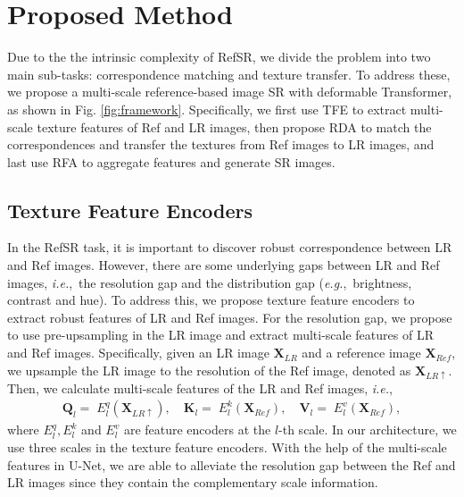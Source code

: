 \documentclass[runningheads]{llncs}
\def\ie{\mbox{\textit{i.e.}, }}
\def\eg{\mbox{\textit{e.g.}, }}
\def\bK{{\bm{K}}}
\def\bQ{{\bm{Q}}}
\def\bV{{\bm{V}}}
\def\bX{{\bm{X}}}
\begin{document}
\section{Proposed Method} 
Due to the the intrinsic complexity of RefSR, we divide the problem into two main sub-tasks: correspondence matching and texture transfer.
To address these, we propose a multi-scale reference-based image SR with deformable Transformer, as shown in Fig. \ref{fig:framework}.
Specifically, we first use TFE to extract multi-scale texture features of Ref and LR images, then propose RDA to match the correspondences and transfer the textures from Ref images to LR images, and last use RFA to aggregate features and generate SR images. 

\subsection{Texture Feature Encoders}
In the RefSR task, it is important to discover robust correspondence between LR and Ref images.
However, there are some underlying gaps between LR and Ref images, \ie the resolution gap and the distribution gap (\eg brightness, contrast and hue).
To address this, we propose texture feature encoders to extract robust features of LR and Ref images.
For the resolution gap, we propose to use pre-upsampling in the LR image and extract multi-scale features of LR and Ref images.
Specifically, given an LR image $\bX_{LR}$ and a reference image $\bX_{Ref}$, we upsample the LR image to the resolution of the Ref image, denoted as $\bX_{LR\uparrow}$. 
Then, we calculate multi-scale features of the LR and Ref images, \ie 
\begin{align}
    \bQ_l =\; E_{l}^q (\bX_{LR\uparrow}), \quad \bK_l =\; E_{l}^k (\bX_{Ref}), \quad \bV_l =\; E_{l}^v (\bX_{Ref}),
\end{align}
where $E_{l}^q, E_{l}^k$ and $E_l^v$ are feature encoders at the $l$-th scale. 
In our architecture, we use three scales in the texture feature encoders.
With the help of the multi-scale features in U-Net, we are able to alleviate the resolution gap between the Ref and LR images since they contain the complementary scale information. 
\end{document}
